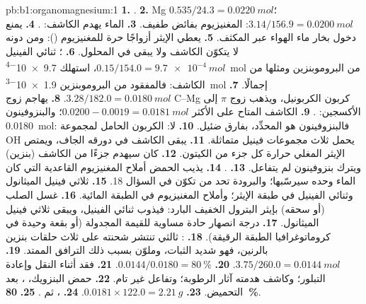 \begin{solution}{pb:b1:organomagnesium:1}
\textbf{1.} .
\textbf{2.} Mg $0.535/24.3 = \qty{0.0220}{mol}$؛  $3.14/156.9 =
\qty{0.0200}{mol}$: المغنيزيوم بفائض طفيف.
\textbf{3.} الماء يهدم الكاشف: .
\textbf{4.} يمنع دخول بخار ماء الهواء عبر
المكثف.
\textbf{5.} يعطي الإيثر أزواجًا حرة للمغنيزيوم ():
ومن دونه لا يتكوّن الكاشف ولا يبقى في المحلول.
\textbf{6.} ؛ ثنائي الفينيل
$0.15/154.0 = \qty{9.7e-4}{mol}$، استهلك \qty{9.7e-4}{mol} من
البروموبنزين ومثلها من الكاشف: فالمفقود من البروموبنزين \qty{1.9e-3}{mol}
إجمالًا.
\textbf{7.} $3.28/182.0 = \qty{0.0180}{mol}$.
\textbf{8.} يهاجم زوج C--Mg كربون الكربونيل، ويذهب زوج $\pi$
إلى الأكسجين:  .
\textbf{9.} الكاشف المتاح على الأكثر $0.0200 - 0.0019 = \qty{0.0181}{mol}$؛
والبنزوفينون \qty{0.0180}{mol}: فالبنزوفينون هو المحدِّد، بفارق ضئيل.
\textbf{10.} لا: الكربون الحامل لمجموعة OH يحمل ثلاث مجموعات فينيل متماثلة.
\textbf{11.} يبقى الكاشف في دورقه الجاف، ويمتص الإيثر المغلي حرارة كل
جزء من الكيتون.
\textbf{12.} كان سيهدم جزءًا من الكاشف (بنزين) ويترك
بنزوفينون لم يتفاعل.
\textbf{13.} .
\textbf{14.} يذيب الحمض أملاح المغنيزيوم القاعدية التي كان الماء
وحده سيرسّبها؛ والبرودة تحد من تكوّن
 في السؤال 18.
\textbf{15.} ثلاثي فينيل الميثانول وثنائي الفينيل في طبقة الإيثر؛
وأملاح المغنيزيوم في الطبقة المائية.
\textbf{16.} غسل الصلب (أو سحقه) بإيثر البترول الخفيف البارد:
فيذوب ثنائي الفينيل، ويبقى ثلاثي فينيل الميثانول.
\textbf{17.} درجة انصهار حادة مساوية للقيمة المجدولة (أو بقعة
وحيدة في كروماتوغرافيا الطبقة الرقيقة).
\textbf{18.} :  ثالثي
تنتشر شحنته على ثلاث حلقات بنزين بالرنين، فهو شديد
الثبات، وملوّن بسبب ذلك الترافق الممتد.
\textbf{19.} $3.75/260.0 = \qty{0.0144}{mol}$.
\textbf{20.} $0.0144/0.0180 = \qty{80}{\percent}$.
\textbf{21.} فقد أثناء النقل وإعادة التبلور؛ وكاشف هدمته
آثار الرطوبة؛ وتفاعل غير تام.
\textbf{22.} حمض البنزويك، ، بعد التحميض.
\textbf{23.} $0.0181 \times 122.0 = \qty{2.21}{g}$.
\textbf{24.} ، ثم
.
\textbf{25.} \textbf{\qty{80}{\percent}}.
\end{solution}
